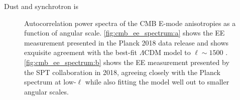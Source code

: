 Dust and synchrotron is 

\begin{figure}[!ht]
    \hfill
    \caption[Planck and SPT EE power spectra]{Autocorrelation power spectra of the CMB E-mode anisotropies as a function of angular scale. \ref{fig:cmb_ee_spectrum:a} shows the EE measurement presented in the Planck 2018 data release and shows exquisite agreement with the best-fit $\Lambda$CDM model to $\ell \sim 1500$ \cite{planck_collaboration_planck_2019}. \ref{fig:cmb_ee_spectrum:b} shows the EE measurement presented by the SPT collaboration in 2018, agreeing closely with the Planck spectrum at low-$\ell$ while also fitting the model well out to smaller angular scales.}
    \label{fig:cmb_ee_spectrum}
\end{figure}

